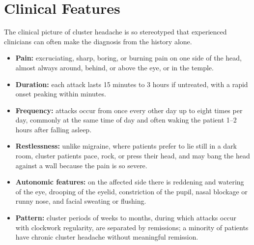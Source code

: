 \section*{Clinical Features}
The clinical picture of cluster headache is so stereotyped that experienced clinicians can often make the diagnosis from the history alone.
\begin{itemize}
    \item \textbf{Pain:} excruciating, sharp, boring, or burning pain on one side of the head, almost always around, behind, or above the eye, or in the temple.
    \item \textbf{Duration:} each attack lasts 15 minutes to 3 hours if untreated, with a rapid onset peaking within minutes.
    \item \textbf{Frequency:} attacks occur from once every other day up to eight times per day, commonly at the same time of day and often waking the patient 1--2 hours after falling asleep.
    \item \textbf{Restlessness:} unlike migraine, where patients prefer to lie still in a dark room, cluster patients pace, rock, or press their head, and may bang the head against a wall because the pain is so severe.
    \item \textbf{Autonomic features:} on the affected side there is reddening and watering of the eye, drooping of the eyelid, constriction of the pupil, nasal blockage or runny nose, and facial sweating or flushing.
    \item \textbf{Pattern:} cluster periods of weeks to months, during which attacks occur with clockwork regularity, are separated by remissions; a minority of patients have chronic cluster headache without meaningful remission.
\end{itemize}

